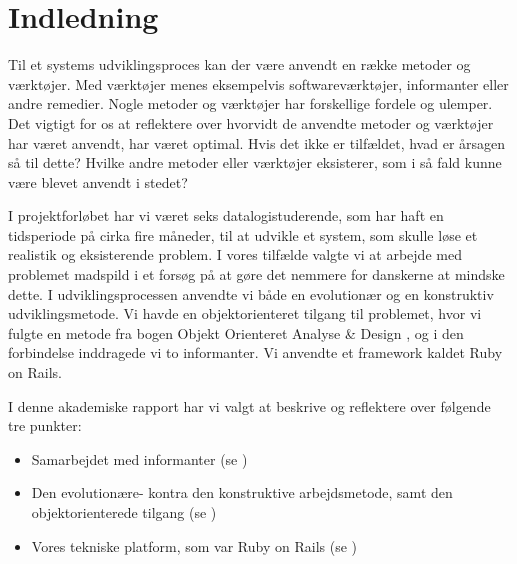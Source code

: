 \chapter{Indledning}

Til et systems udviklingsproces kan der være anvendt en række metoder og værktøjer. Med værktøjer menes eksempelvis softwareværktøjer, informanter eller andre remedier. Nogle metoder og værktøjer har forskellige fordele og ulemper. Det vigtigt for os at reflektere over hvorvidt de anvendte metoder og værktøjer har været anvendt, har været optimal. Hvis det ikke er tilfældet, hvad er årsagen så til dette? Hvilke andre metoder eller værktøjer eksisterer, som i så fald kunne være blevet anvendt i stedet?

I projektforløbet har vi været seks datalogistuderende, som har haft en tidsperiode på cirka fire måneder, til at udvikle et system, som skulle løse et realistik og eksisterende problem. I vores tilfælde valgte vi at arbejde med problemet madspild i et forsøg på at gøre det nemmere for danskerne at mindske dette. I udviklingsprocessen anvendte vi både en evolutionær og en konstruktiv udviklingsmetode. Vi havde en objektorienteret tilgang til problemet, hvor vi fulgte en metode fra bogen Objekt Orienteret Analyse \& Design \cite{ooad}, og i den forbindelse inddragede vi to informanter. Vi anvendte et framework kaldet Ruby on Rails. 

I denne akademiske rapport har vi valgt at beskrive og reflektere over følgende tre punkter:

\begin{itemize}[noitemsep]
  \item Samarbejdet med informanter (se )
  \item Den evolutionære- kontra den konstruktive arbejdsmetode, samt den objektorienterede tilgang (se )
  \item Vores tekniske platform, som var Ruby on Rails (se )
\end{itemize}

